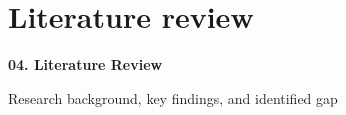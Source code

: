 \documentclass[aspectratio=169,10pt]{beamer}
\begin{document}
\section{Literature review}
\def\mainliteraturereview{}
\begin{frame}[plain]
  \vfill
  \begin{center}
    {\color{lavenderDark}\fontsize{25}{30}\selectfont\bfseries 04. Literature Review\par}
    \vspace{0.45em}
    {\color{prismTeal!85!black}\large Research background, key findings, and identified gap}
  \end{center}
  \vfill
\end{frame}

\hfuzz=2pt
\vfuzz=2pt
\end{document}
